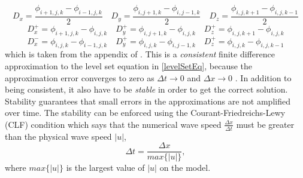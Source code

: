 \begin{equation*}
\nonumber D_x = \frac{\phi_{i+1,j,k} - \phi_{i-1,j,k}}{2} \quad D_y = \frac{\phi_{i,j+1,k}-\phi_{i,j-1,k}}{2} \quad D_z = \frac{\phi_{i,j,k+1}-\phi_{i,j,k-1}}{2} 
\end{equation*}
\begin{equation*}
\nonumber D_x^+ = \phi_{i+1,j,k} - \phi_{i,j,k} \quad D_y^+ = \phi_{i,j+1,k} - \phi_{i,j,k} \quad D_z^+ = \phi_{i,j,k+1} - \phi_{i,j,k} 
\end{equation*}
\begin{equation*} 
D_x^- = \phi_{i,j,k} - \phi_{i-1,j,k} \quad D_y^+ = \phi_{i,j,k} - \phi_{i,j-1,k} \quad D_z^+ = \phi_{i,j,k} - \phi_{i,j,k-1}
\end{equation*}
\begin{equation}
\quad %
\end{equation}
which is taken from the appendix of \cite{lefohn04}. This is a \textit{consistent} finite difference approximation to the level set equation in \ref{levelSetEq}, because the approximation error converges to zero as \(\Delta t \rightarrow 0\) and \(\Delta x \rightarrow 0\) \cite{osher02}. In addition to being consistent, it also have to be \textit{stable} in order to get the correct solution. Stability guarantees that small errors in the approximations are not amplified over time. The stability can be enforced using the  Courant-Friedreichs-Lewy (CLF) condition which says that the numerical wave speed \(\frac{\Delta x}{\Delta t}\) must be greater than the physical wave speed \(|u|\),
\begin{equation}
\Delta t = \frac{\Delta x}{max\{|u|\}},
\end{equation}
where \(max\{|u|\}\) is the largest value of \(|u|\) on the model.

